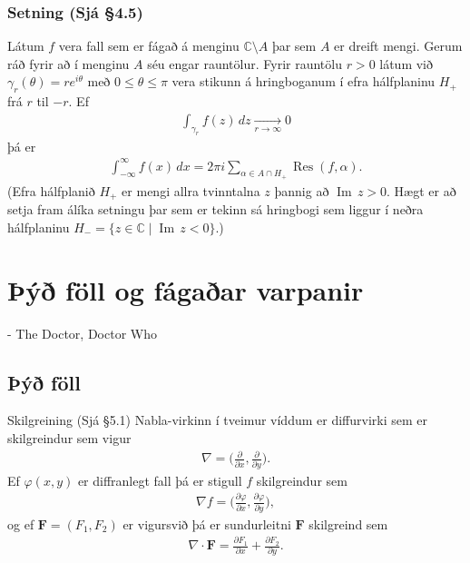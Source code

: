 \documentclass[a4paper,10pt,icelandic]{sphinxmanual}
\begin{document}
\subsection{Setning (Sjá \S{}4.5)}
\label{\detokenize{Kafli04:id3}}
Látum \(f\) vera fall sem er fágað á menginu \({\mathbb{C}}\setminus A\) þar sem \(A\) er dreift mengi. Gerum ráð fyrir að í menginu \(A\) séu engar rauntölur. Fyrir rauntölu \(r>0\) látum við \(\gamma_r(\theta)=re^{i\theta}\) með \(0\leq\theta\leq \pi\) vera stikunn á hringboganum í efra hálfplaninu \(H_+\) frá \(r\) til \(-r\). Ef
\begin{equation*}
\begin{split}\int_{\gamma_r}f(z)\,dz\xrightarrow[r\rightarrow\infty]{} 0\end{split}
\end{equation*}
þá er
\begin{equation*}
\begin{split}\int_{-\infty}^\infty f(x)\,dx=2\pi i\sum_{\alpha\in A\cap H_+}\operatorname{Res}(f,\alpha).\end{split}
\end{equation*}
(Efra hálfplanið \(H_+\) er mengi allra tvinntalna \(z\) þannig
að \(\operatorname{Im\, } z>0\). Hægt er að setja fram álíka setningu þar sem er
tekinn sá hringbogi sem liggur í neðra hálfplaninu
\(H_-=\{z\in {\mathbb{C}}\mid \operatorname{Im\, } z<0\}\).)


\chapter{Þýð föll og fágaðar varpanir}
\label{\detokenize{Kafli05:y-foll-og-fagaar-varpanir}}\label{\detokenize{Kafli05::doc}}

- The Doctor, Doctor Who


\section{Þýð föll}
\label{\detokenize{Kafli05:y-foll}}
Skilgreining (Sjá \S{}5.1) Nabla-virkinn í tveimur víddum er diffurvirki sem er skilgreindur sem vigur
\begin{equation*}
\begin{split}\nabla=\Big(\frac{\partial}{\partial x},  \frac{\partial}{\partial y}\Big).\end{split}
\end{equation*}
Ef \(\varphi(x,y)\) er diffranlegt fall þá er stigull \(f\) skilgreindur sem
\begin{equation*}
\begin{split}\nabla f=\Big(\frac{\partial \varphi}{\partial x},  \frac{\partial \varphi}{\partial y}\Big),\end{split}
\end{equation*}
og ef \({\mathbf F}=(F_1, F_2)\) er vigursvið þá er sundurleitni \({\mathbf F}\) skilgreind sem
\begin{equation*}
\begin{split}\nabla\cdot{\mathbf F}=\frac{\partial F_1}{\partial x}+
\frac{\partial F_2}{\partial y}.\end{split}
\end{equation*}
\end{document}
